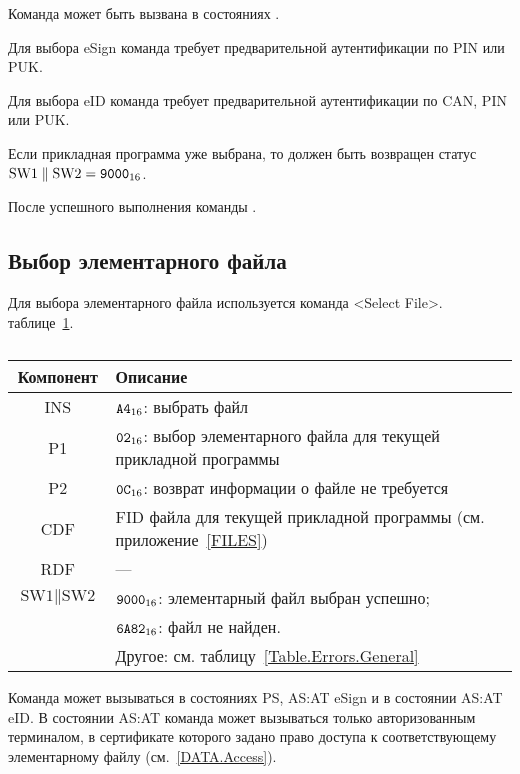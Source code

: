 Команда может быть вызвана в состояниях .

Для выбора  eSign команда требует 
предварительной аутентификации по PIN или PUK.

Для выбора  eID команда требует 
предварительной аутентификации по CAN, PIN или PUK.

Если прикладная программа уже выбрана, то должен быть возвращен
статус $\text{SW1} \parallel \text{SW2} = \texttt{9000}_{16}$.

После успешного выполнения команды .

\subsection{Выбор элементарного файла}
\label{Oper.Descr.SelectEF}

Для выбора элементарного файла используется команда <Select File>. 
 таблице~\ref{Table.Oper.SelectEFCmd}.

\begin{table}[hbt]
\caption{}\label{Table.Oper.SelectEFCmd}
\begin{tabular}{|c|p{14cm}|}
\hline
Компонент & Описание \\
\hline
\hline
INS & $\texttt{A4}_{16}$: выбрать файл\\ 
\hline
P1 & $\texttt{02}_{16}$: выбор элементарного файла для текущей прикладной программы\\
\hline
P2 & $\texttt{0C}_{16}$: возврат информации о файле не требуется \\
\hline
CDF & FID файла для текущей прикладной программы (см. приложение~\ref{FILES})\\
\hline 
RDF &  --- \\
\hline
$\text{SW1}\parallel\text{SW2}$ & 
$\texttt{9000}_{16}$: элементарный файл выбран успешно; \\
  & $\texttt{6A82}_{16}$: файл не найден. \\
  & Другое: см. таблицу~\ref{Table.Errors.General}\\
\hline
\end{tabular}
\end{table}

Команда может вызываться в состояниях PS, AS:AT 
 eSign и в состоянии AS:AT  eID. В состоянии AS:AT команда может вызываться только 
авторизованным терминалом, в сертификате которого
задано право доступа к соответствующему элементарному файлу (см.~\ref{DATA.Access}).

